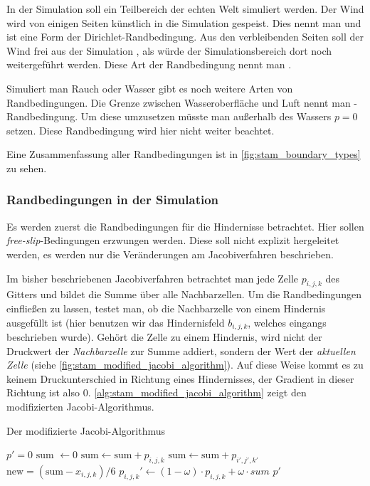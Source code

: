 In der Simulation soll ein Teilbereich der echten Welt simuliert werden. Der
Wind wird von einigen Seiten künstlich in die Simulation gespeist. Dies nennt
man  und ist eine Form der
Dirichlet-Randbedingung. Aus den verbleibenden Seiten soll der Wind frei aus der
Simulation , als würde der Simulationsbereich dort
noch weitergeführt werden. Diese Art der Randbedingung nennt man
.

Simuliert man Rauch oder Wasser gibt es noch weitere Arten von
Randbedingungen.  Die Grenze zwischen Wasseroberfläche und Luft nennt
man -Randbedingung. Um diese umzusetzen
müsste man außerhalb des Wassers $p=0$ setzen. Diese Randbedingung
wird hier nicht weiter beachtet.

Eine Zusammenfassung aller Randbedingungen ist in \cref{fig:stam_boundary_types} zu sehen.

\subsubsection{Randbedingungen in der Simulation}

Es werden zuerst die Randbedingungen für die Hindernisse betrachtet. Hier sollen
\emph{free-slip}-Bedingungen erzwungen werden. Diese soll nicht explizit
hergeleitet werden, es werden nur die Veränderungen am Jacobiverfahren
beschrieben.

Im bisher beschriebenen Jacobiverfahren betrachtet man jede Zelle $p_{i,j,k}$
des Gitters und bildet die Summe über alle Nachbarzellen. Um die Randbedingungen
einfließen zu lassen, testet man, ob die Nachbarzelle von einem Hindernis
ausgefüllt ist (hier benutzen wir das Hindernisfeld $b_{i,j,k}$, welches eingangs
beschrieben wurde). Gehört die Zelle zu einem Hindernis, wird nicht der
Druckwert der \emph{Nachbarzelle} zur Summe addiert, sondern der Wert der
\emph{aktuellen Zelle} (siehe \cref{fig:stam_modified_jacobi_algorithm}). Auf
diese Weise kommt es zu keinem Druckunterschied in Richtung eines Hindernisses,
der Gradient in dieser Richtung ist also
0. \cref{alg:stam_modified_jacobi_algorithm} zeigt den modifizierten
Jacobi-Algorithmus.

\begin{algorithm}
\caption{Der modifizierte Jacobi-Algorithmus}
\begin{algorithmic}
	\State $p' = 0$
		\State $\textrm{sum } \gets 0$
				\State $\textrm{sum} \gets \textrm{sum} + p_{i,j,k}$
			\Else
				\State $\textrm{sum} \gets \textrm{sum} + p_{i',j',k'}$
			\EndIf
		\EndFor
		\State $\textrm{new} = (\textrm{sum} - x_{i,j,k})/6$
		\State $p_{i,j,k}' \gets (1-\omega) \cdot p_{i,j,k} + \omega \cdot sum$
	\EndFor
	\State \Return $p'$
\EndFunction
\end{algorithmic}
\label{alg:stam_modified_jacobi_algorithm}
\end{algorithm}

